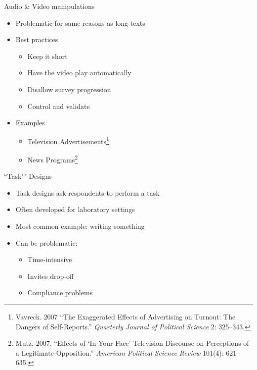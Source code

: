 \documentclass[
  ignorenonframetext,
]{beamer}
\begin{document}
\begin{frame}{Audio \& Video manipulations}
\protect\hypertarget{audio-video-manipulations}{}
\small

\begin{itemize}\itemsep-0.2em
\item Problematic for same reasons as long texts
\item<2-> Best practices
    \begin{itemize}\footnotesize
    \item Keep it short
    \item Have the video play automatically
    \item Disallow survey progression
    \item Control and validate
    \end{itemize}
\item<3->Examples
    \begin{itemize}
    \item Television Advertisements\footnote{Vavreck. 2007 ``The Exaggerated Effects of Advertising on Turnout: The Dangers of Self-Reports.'' \textit{Quarterly Journal of Political Science} 2: 325--343.} 
    \item News Programs\footnote{Mutz. 2007. ``Effects of `In-Your-Face' Television Discourse on Perceptions of a Legitimate Opposition.'' \textit{American Political Science Review} 101(4): 621--635.}
    \end{itemize}   
\end{itemize}
\end{frame}

\begin{frame}{``Task'\,' Designs}
\protect\hypertarget{task-designs}{}
\begin{itemize}\itemsep0.5em
\item Task designs ask respondents to perform a task
\item Often developed for laboratory settings
\item<2-> Most common example: writing something
\item<3-> Can be problematic:
    \begin{itemize}
    \item Time-intensive
    \item Invites drop-off
    \item Compliance problems
    \end{itemize}
\end{itemize}
\end{frame}
\end{document}
